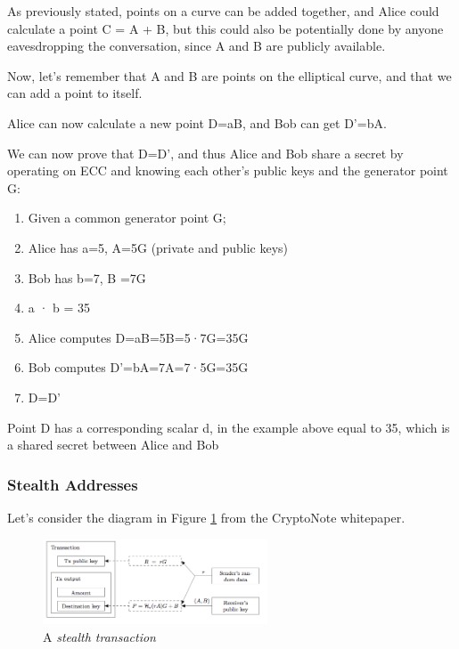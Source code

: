 As previously stated, points on a curve can be added together, and Alice could calculate a point C = A + B, but this could also be potentially done by anyone eavesdropping the conversation, since A and B are publicly available.

Now, let's remember that A and B are points on the elliptical curve, and that we can add a point to itself.

Alice can now calculate a new point D=aB,  and Bob can get D'=bA.

We can now prove that D=D', and thus Alice and Bob share a secret by operating on ECC and knowing each other's public keys and the generator point G:

\begin{enumerate}
\item Given a common generator point G;
\item Alice has a=5, A=5G (private and public keys)
\item Bob has b=7, B =7G
\item a · b = 35
\item Alice computes D=aB=5B=5·7G=35G
\item Bob computes D'=bA=7A=7·5G=35G
\item D=D'
\end{enumerate}

Point D has a corresponding scalar d, in the example above equal to 35, which is a shared secret between Alice and Bob

\subsubsection{Stealth Addresses}

Let's consider the diagram in Figure \ref{fig:cryptodg} from the CryptoNote whitepaper.

\begin{figure}
\includegraphics[height=1in]{M42G4Fy}
\caption{A \textit{stealth transaction}}
\label{fig:cryptodg}
\end{figure}

